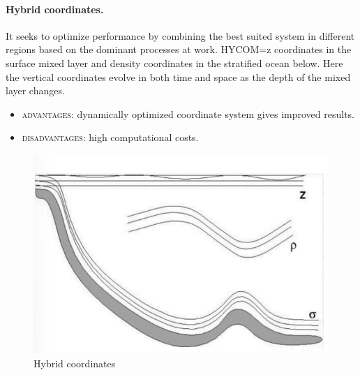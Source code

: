 \paragraph{Hybrid coordinates.} It seeks to optimize performance by combining the best suited system in different regions based on the dominant processes at work. HYCOM=z coordinates in the surface mixed layer and density coordinates in the stratified ocean below. Here the vertical coordinates evolve in both time and space as the depth of the mixed layer changes.
\begin{itemize}
	\item \textsc{advantages}: dynamically optimized coordinate system gives improved results.
	\item\textsc{disadvantages}: high computational costs.
\end{itemize}

\begin{figure}[h!]
	\centering
	\includegraphics[width=0.5\linewidth]{uploads/Screenshot 2024-11-22 000943.png}
	\caption{Hybrid coordinates}
	\label{fig:enter-label}
\end{figure}
